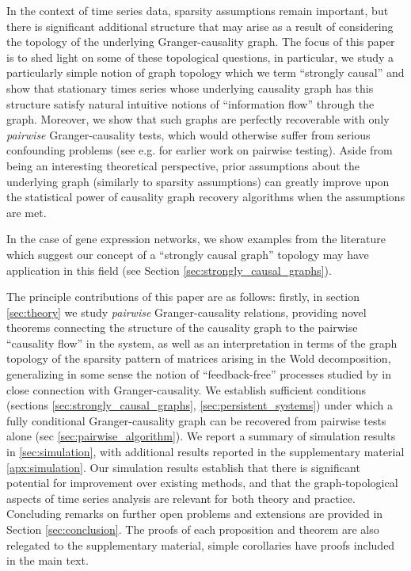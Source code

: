 \documentclass{statsoc}
\begin{document}
In the context of time series data, sparsity assumptions remain
important, but there is significant additional structure that may
arise as a result of considering the topology of the underlying
Granger-causality graph.  The focus of this paper is to shed light on
some of these topological questions, in particular, we study a
particularly simple notion of graph topology which we term
``strongly causal'' and show that stationary times series whose
underlying causality graph has this structure satisfy natural
intuitive notions of ``information flow'' through the graph.
Moreover, we show that such graphs are perfectly recoverable with only
\textit{pairwise} Granger-causality tests, which would otherwise
suffer from serious confounding problems (see
e.g. \cite{tam2013gene_pwgc} for earlier work on pairwise testing).
Aside from being an interesting theoretical perspective, prior
assumptions about the underlying graph (similarly to sparsity
assumptions) can greatly improve upon the statistical power of
causality graph recovery algorithms when the assumptions are met.

In the case of gene expression networks, we show examples from the
literature which suggest our concept of a ``strongly causal graph''
topology may have application in this field (see Section
\ref{sec:strongly_causal_graphs}).

The principle contributions of this paper are as follows: firstly, in
section \ref{sec:theory} we study \textit{pairwise} Granger-causality
relations, providing novel theorems connecting the structure of the
causality graph to the pairwise ``causality flow'' in the system, as
well as an interpretation in terms of the graph topology of the
sparsity pattern of matrices arising in the Wold decomposition,
generalizing in some sense the notion of ``feedback-free'' processes
studied by \cite{caines1975feedback} in close connection with
Granger-causality.  We establish sufficient conditions (sections
\ref{sec:strongly_causal_graphs}, \ref{sec:persistent_systems}) under
which a fully conditional Granger-causality graph can be recovered
from pairwise tests alone (sec \ref{sec:pairwise_algorithm}).  We
report a summary of simulation results in \ref{sec:simulation}, with
additional results reported in the supplementary material
\ref{apx:simulation}.  Our simulation results establish that there is
significant potential for improvement over existing methods, and that
the graph-topological aspects of time series analysis are relevant for
both theory and practice.  Concluding remarks on further open problems
and extensions are provided in Section \ref{sec:conclusion}.  The
proofs of each proposition and theorem are also relegated to the
supplementary material, simple corollaries have proofs included in the
main text.
\end{document}
